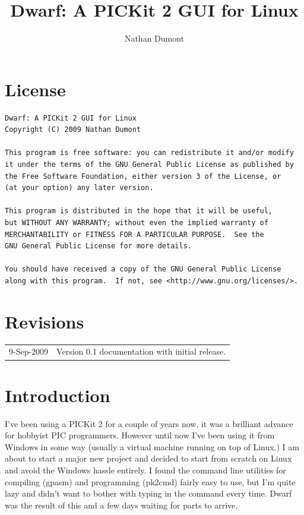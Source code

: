\documentclass[a4paper,10pt]{article}
\title{Dwarf: A PICKit 2 GUI for Linux}
\author{Nathan Dumont}
\begin{document}
\maketitle

\tableofcontents

\newpage
\section{License}
\begin{verbatim}
Dwarf: A PICKit 2 GUI for Linux
Copyright (C) 2009 Nathan Dumont

This program is free software: you can redistribute it and/or modify
it under the terms of the GNU General Public License as published by
the Free Software Foundation, either version 3 of the License, or
(at your option) any later version.

This program is distributed in the hope that it will be useful,
but WITHOUT ANY WARRANTY; without even the implied warranty of
MERCHANTABILITY or FITNESS FOR A PARTICULAR PURPOSE.  See the
GNU General Public License for more details.

You should have received a copy of the GNU General Public License
along with this program.  If not, see <http://www.gnu.org/licenses/>.
\end{verbatim}

\section{Revisions}
\begin{tabular}{ll}
 9-Sep-2009&Version 0.1 documentation with initial release.
\end{tabular}

\section{Introduction}
I've been using a PICKit 2 for a couple of years now, it was a brilliant advance for hobbyist PIC programmers.  However until now I've been using it from Windows in some way (usually a virtual machine running on top of Linux.)  I am about to start a major new project and decided to start from scratch on Linux and avoid the Windows hassle entirely.  I found the command line utilities for compiling (gpasm) and programming (pk2cmd) fairly easy to use, but I'm quite lazy and didn't want to bother with typing in the command every time.  Dwarf was the result of this and a few days waiting for parts to arrive.
\end{document}

